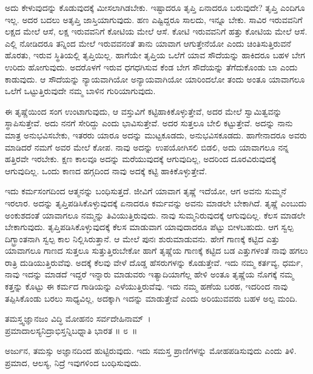ಅದು ಕೇಳುವುದನ್ನು ಕೊಡುವುದಕ್ಕೆ ಮೀಸಲಾಗಿಡಬೇಕು. ಇಷ್ಟಾದರೂ ತೃಪ್ತಿ ಏನಾದರೂ ಬರುವುದೇ? ತೃಪ್ತಿ ಎಂದಿಗೂ ಇಲ್ಲ. ಅದರ ಬದಲು ಅತೃಪ್ತಿ ಜಾಸ್ತಿಯಾಗುವುದು. ಹಣ ಎಷ್ಟಿದ್ದರೂ ಸಾಲದು, ಇನ್ನೂ ಬೇಕು. ಸಾವಿರ ಇರುವವನಿಗೆ ಲಕ್ಷದ ಮೇಲೆ ಆಸೆ, ಲಕ್ಷ ಇರುವವನಿಗೆ ಕೋಟಿಯ ಮೇಲೆ ಆಸೆ. ಕೋಟಿ ಇರುವವನಿಗೆ ಹತ್ತು ಕೋಟಿಯ ಮೇಲೆ ಆಸೆ. ಎಲ್ಲಿ ನೋಡಿದರೂ ತನ್ನಿಂದ ಮೇಲೆ ಇರುವವನಂತೆ ತಾನು ಯಾವಾಗ ಆಗುತ್ತೇನೆಯೋ ಎಂದು ಚಿಂತಿಸುತ್ತಿರುವನೆ ಹೊರತು, ಇರುವ ಸ್ಥಿತಿಯಲ್ಲಿ ತೃಪ್ತಿಯಿಲ್ಲ. ಹಾಗೆಯೇ ತೃಪ್ತಿಯ ಒಲೆಗೆ ಯಾವ ಸೌದೆಯನ್ನು ಹಾಕಿದರೂ ಬಹಳ ಬೇಗ ಉರಿದು ಹೋಗುವುದು. ಅದರೊಳಗೆ ಇರುವ ಧಗಧಗಿಸುವ ಕೆಂಡ ಬೇಗ ಸೌದೆಯನ್ನು ತೆಗೆದುಕೊಂಡು ಬಾ ಎಂದು ಕಾಡುವುದು. ಆ ಸೌದೆಯನ್ನು ನ್ಯಾಯವಾಗಿಯೋ ಅನ್ಯಾಯವಾಗಿಯೋ ಯಾರಿಂದಲೋ ತಂದು ಅಂತೂ ಯಾವಾಗಲೂ ಒಲೆಗೆ ಒಟ್ಟುತ್ತಿರುವುದೇ ನಮ್ಮ ಬಾಳಿನ ಗುರಿಯಾಗುವುದು.

ಈ ತೃಷ್ಣೆಯಿಂದ ಸಂಗ ಉಂಟಾಗುವುದು, ಆ ವಸ್ತುವಿಗೆ ಕಟ್ಟಿಹಾಕಿಕೊಳ್ಳುತ್ತೇವೆ, ಅದರ ಮೇಲೆ ಸ್ವಾಮಿತ್ವವನ್ನು ಸ್ಥಾಪಿಸುತ್ತೇವೆ. ಅದು ನನಗೆ ಸೇರಿದ್ದು ಎಂದು ಭಾವಿಸುತ್ತೇವೆ. ಅದರ ಸುತ್ತಲೂ ಬೇಲಿ ಕಟ್ಟುತ್ತೇವೆ. ಅದನ್ನು ನಾನು ಮಾತ್ರ ಅನುಭವಿಸಬೇಕು, ಇತರರು ಯಾರೂ ಅದನ್ನು ಮುಟ್ಟಕೂಡದು, ಅನುಭವಿಸಕೂಡದು. ಹಾಗೇನಾದರೂ ಅವರು ಮಾಡಿದರೆ ನಮಗೆ ಅವರ ಮೇಲೆ ಕೋಪ. ನಾವು ಅದನ್ನು ಉಪಯೋಗಿಸಲಿ ಬಿಡಲಿ, ಅದು ಯಾವಾಗಲೂ ನನ್ನ ಹತ್ತಿರವೇ ಇರಬೇಕು. ಕ್ಷಣ ಕಾಲವೂ ಅದನ್ನು ಮರೆಯುವುದಕ್ಕೆ ಆಗುವುದಿಲ್ಲ, ಅದರಿಂದ ದೂರವಿರುವುದಕ್ಕೆ ಆಗುವುದಿಲ್ಲ. ಒಂದು ಕಾಣದ ಹಗ್ಗದಿಂದ ನಾವು ಅದಕ್ಕೆ ಕಟ್ಟಿ ಹಾಕಿಕೊಳ್ಳುತ್ತೇವೆ.

ಇದು ಕರ್ಮಸಂಗದಿಂದ ಆತ್ಮನನ್ನು ಬಂಧಿಸುತ್ತದೆ. ಜೀವಿಗೆ ಯಾವಾಗ ತೃಷ್ಣೆ ಇದೆಯೋ, ಆಗ ಅವನು ಸುಮ್ಮನೆ ಇರಲಾರ. ಅದನ್ನು ತೃಪ್ತಿಪಡಿಸಿಕೊಳ್ಳುವುದಕ್ಕೆ ಏನಾದರೂ ಕರ್ಮವನ್ನು ಅವನು ಮಾಡಲೇ ಬೇಕಾಗಿದೆ. ತೃಷ್ಣೆ ಎಂಬುದು ಅಂಕುಶದಂತೆ ಯಾವಾಗಲೂ ನಮ್ಮನ್ನು ತಿವಿಯುತ್ತಿರುವುದು. ನಾವು ಸುಮ್ಮನಿರುವುದಕ್ಕೆ ಆಗುವುದಿಲ್ಲ. ಕೆಲಸ ಮಾಡಲೇ ಬೇಕಾಗುವುದು. ತೃಪ್ತಿಪಡಿಸಿಕೊಳ್ಳುವುದಕ್ಕೆ ಕೆಲಸ ಮಾಡುವಾಗ ಯಾವುದಾದರೂ ಪೆಟ್ಟು ಬೀಳಬಹುದು. ಆಗ ಸ್ವಲ್ಪ ದಿಗ್ಭ್ರಾಂತನಾಗಿ ಸ್ವಲ್ಪ ಕಾಲ ನಿಲ್ಲಿಸಿರುತ್ತಾನೆ. ಆ ಮೇಲೆ ಪುನಃ ಶುರುಮಾಡುವನು. ಹೇಗೆ ಗಾಣಕ್ಕೆ ಕಟ್ಟಿದ ಎತ್ತು ಯಾವಾಗಲೂ ಗಾಣದ ಸುತ್ತಲೂ ಸುತ್ತುತ್ತಿರುಬೇಕೋ ಹಾಗೆ ತೃಷ್ಣೆಯ ಗಾಣಕ್ಕೆ ಕಟ್ಟಿದ ಬಡ ಎತ್ತುಗಳಂತೆ ನಾವು ಹಗಲು ರಾತ್ರಿ ದುಡಿಯುತ್ತಿರುವೆವು. ಅದಕ್ಕೆ ಕೆಲವು ವೇಳೆ ದೊಡ್ಡ ಹೆಸರುಗಳನ್ನು ಕೊಡುತ್ತೇವೆ. ಇದು ನಮ್ಮ ಕರ್ತವ್ಯ, ಧರ್ಮ, ನಾವು ಇದನ್ನು ಮಾಡದೆ ಇದ್ದರೆ ಇನ್ನಾರು ಮಾಡುವರು ಇತ್ಯಾದಿಯಾಗೆಲ್ಲ ಹೇಳಿ ಅಂತೂ ತೃಷ್ಣೆಯ ನೊಗಕ್ಕೆ ನಮ್ಮ ಕತ್ತನ್ನು ಕೊಟ್ಟು ಈ ಕರ್ಮದ ಗಾಡಿಯನ್ನು ಎಳೆಯುತ್ತಿರುವೆವು. ಇದು ನಮ್ಮ ಹಣೆಯ ಬರಹ, ಇದರಿಂದ ನಾವು ತಪ್ಪಿಸಿಕೊಂಡು ಬರಲು ಸಾಧ್ಯವಿಲ್ಲ, ಅದಕ್ಕಾಗಿ ಇದನ್ನು ಮಾಡುತ್ತೇವೆ ಎಂದು ಅರಿಯುವವರು ಬಹಳ ಅಲ್ಪ ಮಂದಿ.

\begin{shloka}
ತಮಸ್ತ್ವಜ್ಞಾನಜಂ ವಿದ್ಧಿ ಮೋಹನಂ ಸರ್ವದೇಹಿನಾಮ್~।\\ಪ್ರಮಾದಾಲಸ್ಯನಿದ್ರಾಭಿಸ್ತನ್ನಿಬಧ್ನಾತಿ ಭಾರತ \hfill॥ ೮~॥
\end{shloka}

\begin{artha}
ಅರ್ಜುನ, ತಮಸ್ಸು ಅಜ್ಞಾನದಿಂದ ಹುಟ್ಟಿರುವುದು. ಇದು ಸಮಸ್ತ ಪ್ರಾಣಿಗಳನ್ನು ಮೋಹಪಡಿಸುವುದು ಎಂದು ತಿಳಿ. ಪ್ರಮಾದ, ಆಲಸ್ಯ, ನಿದ್ರೆ ಇವುಗಳಿಂದ ಬಂಧಿಸುವುದು.
\end{artha}

